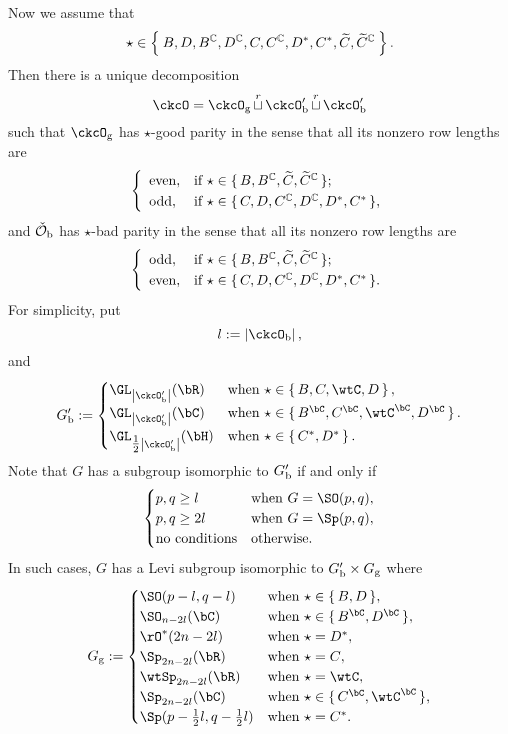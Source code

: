 \documentclass[counting_main.tex]{subfiles}
\begin{document}
Now we assume that
\[
\star\in \Set{ B, D,   B^{\mathbb{C}}, D^{\mathbb{C}}, C, C^{\mathbb{C}}, D^*, C^*, \widetilde C, \widetilde C^{\mathbb{C}}}.
\]
Then there is a unique decomposition
 \[
   \ckcO=\ckcOg \cuprow \ckcOpb\cuprow \ckcOpb
 \]
 such that $\ckcOg$ has $\star$-good parity in the sense that all its nonzero row lengths are
 \[
 \left\{
     \begin{array}{ll}
       \textrm{even}, &\hbox{if $\star\in \set{B, B^\C, \widetilde C, \widetilde C^\C}$}; \smallskip\\
         \textrm{odd}, &\hbox{if $\star\in \set{C, D, C^\C, D^\C, D^*, C^*}$},
          \end{array}
   \right.
   \]
   and $\check {{\mathcal {O}}}_{\mathrm b}$ has $\star$-bad parity in the sense that
   all its nonzero row lengths are
 \[
 \left\{
     \begin{array}{ll}
       \textrm{odd}, &\hbox{if  $\star\in \set{B, B^\C, \widetilde C, \widetilde C^\C}$}; \smallskip\\
         \textrm{even}, &\hbox{if  $\star\in \set{C, D, C^\C, D^\C, D^*, C^*}$}.
          \end{array}
   \right.
   \]
For simplicity, put
\[
  l:=\abs{\ckcOb},
\]
and
\[
\Gpb := \begin{cases}
  \GL_{\abs{\ckcOpb}}(\bR) & \text{when } \star \in \set{B,C,\wtC,D}, \\
  \GL_{\abs{\ckcOpb}}(\bC) & \text{when } \star \in \set{B^{\bC},C^{\bC},\wtC^{\bC},D^{\bC}}. \\
  \GL_{\half \abs{\ckcOpb}}(\bH) & \text{when } \star \in \set{C^{*},D^{*}}. \\
\end{cases}
\]
Note that $G$ has a subgroup isomorphic to
$G'_{\mathrm b}$
if and only if
\[
  \begin{cases}
    p,q\geq l & \text{when $G = \SO(p,q)$},\\
    p,q\geq 2l &  \text{when $G = \Sp(p,q)$},\\
    \text{no conditions} & \text{otherwise}.
  \end{cases}
\]
In such cases, $G$ has a Levi subgroup isomorphic to  $G'_{\mathrm b}\times G_{\mathrm g}$
where
\[
  \Gg :=
  \begin{cases}
    \SO(p-l,q-l) & \textrm{when $\star\in \set{B,D}$},\\
    \SO_{n-2l}(\bC) &\textrm{when $\star\in \set{B^{\bC},D^{\bC}}$},\\
    \rO^{*}(2n-2l) &\textrm{when $\star = D^{*}$},\\
    \Sp_{2n-2l}(\bR) &\textrm{when $\star = C$},\\
    \wtSp_{2n-2l}(\bR) &\textrm{when $\star = \wtC$},\\
    \Sp_{2n-2l}(\bC) &\textrm{when $\star \in \set{C^{\bC},\wtC^{\bC}}$},\\
    \Sp(p-\half l,q-\half l) &\textrm{when $\star = C^{*}$}.\\
  \end{cases}
\]
\end{document}
